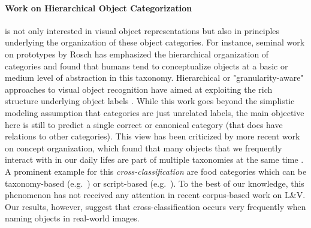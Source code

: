 \paragraph{Work on Hierarchical Object Categorization} is not only interested in visual object representations but also in principles underlying the organization of these object categories. 
For instance, seminal work on prototypes by Rosch \cite{rosch1976basic} has emphasized the hierarchical organization of categories and found that humans tend to conceptualize objects at a basic or medium level of abstraction in this taxonomy. 
Hierarchical or "granularity-aware" approaches to visual object recognition have aimed at exploiting the rich structure underlying object labels \cite{Deng:2012,frome2013,deng2014large,wang2014poodle,peterson2018learning}. 
While this work goes beyond the simplistic modeling assumption that categories are just unrelated labels, the main objective here is still to predict a single correct or canonical category (that does have relations to other categories). 
This view has been criticized by more recent work on concept organization, which found that many objects that we frequently interact with in our daily lifes are part of multiple taxonomies at the same time \cite{ross1999food,SHAFTO20111}. A prominent example for this \textit{cross-classification} are food categories which can be taxonomy-based (e.g.\  ) or script-based (e.g.\  ).
To the best of our knowledge, this phenomenon has not received any attention in recent corpus-based work on L\&V.
Our results, however, suggest that cross-classification occurs very frequently when naming objects in real-world images.
 



